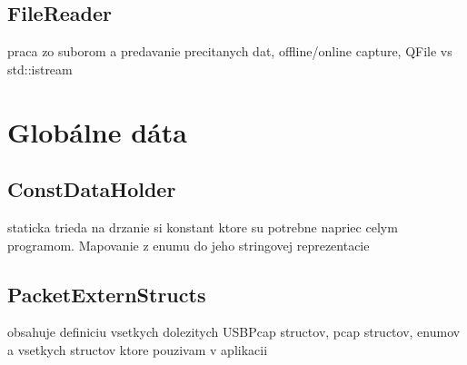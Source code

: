 \subsection{FileReader}
praca zo suborom a predavanie precitanych dat, offline/online capture, QFile vs std::istream
\section{Globálne dáta}
\subsection{ConstDataHolder}
staticka trieda na drzanie si konstant ktore su potrebne napriec celym programom. Mapovanie z enumu do jeho stringovej reprezentacie
\subsection{PacketExternStructs}
obsahuje definiciu vsetkych dolezitych USBPcap structov, pcap structov, enumov a vsetkych structov ktore pouzivam v aplikacii












